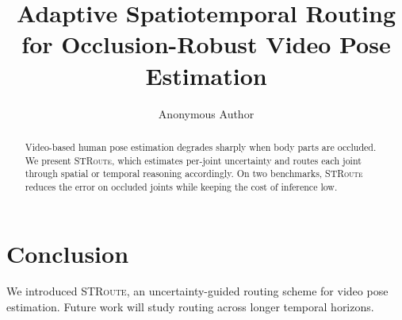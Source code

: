 \documentclass[11pt]{article}
\title{Adaptive Spatiotemporal Routing for Occlusion-Robust Video Pose Estimation}
\author{Anonymous Author}
\date{}
\newcommand{\method}{\textsc{STRoute}}
\begin{document}
\maketitle

\begin{abstract}
Video-based human pose estimation degrades sharply when body parts are occluded.
We present \method{}, which estimates per-joint uncertainty and routes each joint
through spatial or temporal reasoning accordingly. On two benchmarks, \method{}
reduces the error on occluded joints while keeping the cost of inference low.
\end{abstract}






\section{Conclusion}
We introduced \method{}, an uncertainty-guided routing scheme for video pose
estimation. Future work will study routing across longer temporal horizons.



\end{document}
